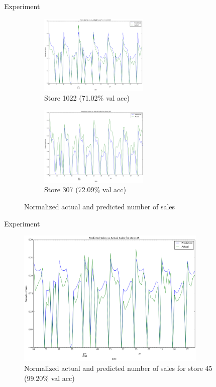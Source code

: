 \documentclass[10pt]{beamer}
\begin{document}
\begin{frame}{Experiment}
    \begin{figure}[t!]
        \centering
        \begin{subfigure}[t]{0.5\textwidth}
            \centering
            \includegraphics[height=1.5in]{rossmann_prediction_errors_store1022}
            \caption{Store 1022 (71.02\% val acc)}
        \end{subfigure}%
        \begin{subfigure}[t]{0.5\textwidth}
            \centering
            \includegraphics[height=1.5in]{rossmann_prediction_errors_store307}
            \caption{Store 307 (72.09\% val acc)}
        \end{subfigure}
        \label{fig:sub1}
        \caption{Normalized actual and predicted number of sales}
    \end{figure}
\end{frame}

\begin{frame}{Experiment}
    \begin{figure}[t!]
        \centering
        \includegraphics[height=2.6in]{rossmann_prediction_errors_store45}
        \caption{Normalized actual and predicted number of sales for store 45 (99.20\% val acc)}
    \end{figure}
\end{frame}
\end{document}
